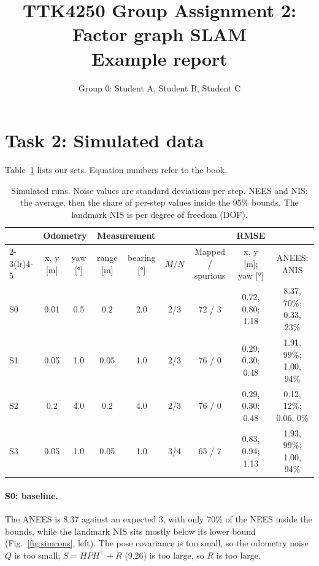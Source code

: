 \documentclass[11pt,a4paper]{article}
\title{TTK4250 Group Assignment 2: Factor graph SLAM\\[2pt]\large Example report}
\author{Group 0: Student A, Student B, Student C}
\date{}
\newcommand{\figref}[1]{Fig.~\ref{#1}}
\newcommand{\tabref}[1]{Table~\ref{#1}}
\begin{document}
\maketitle
\vspace{-2em}

\section*{Task 2: Simulated data}

\tabref{tab:sim} lists our sets. Equation numbers refer to the book.

\begin{table}[h]
\centering\footnotesize
\caption{Simulated runs. Noise values are standard deviations per step. NEES and NIS: the average, then the share of per-step values inside the 95\% bounds. The landmark NIS is per degree of freedom (DOF).}
\label{tab:sim}
\setlength{\tabcolsep}{4pt}
\begin{tabular}{lcccccccc}
\toprule
 & \multicolumn{2}{c}{Odometry} & \multicolumn{2}{c}{Measurement} & & & RMSE & \\
\cmidrule(lr){2-3}\cmidrule(lr){4-5}
 & x, y [m] & yaw [°] & range [m] & bearing [°] & \(M/N\) & Mapped / spurious & x, y [m]; yaw [°] & ANEES; ANIS \\
\midrule
S0 & 0.01 & 0.5 & 0.2 & 2.0 & 2/3 & 72 / 3 & 0.72, 0.80; 1.18 & 8.37, 70\%; 0.33, 23\% \\
S1 & 0.05 & 1.0 & 0.05 & 1.0 & 2/3 & 76 / 0 & 0.29, 0.30; 0.48 & 1.91, 99\%; 1.00, 94\% \\
S2 & 0.2 & 4.0 & 0.2 & 4.0 & 2/3 & 76 / 0 & 0.29, 0.30; 0.48 & 0.12, 12\%; 0.06, 0\% \\
S3 & 0.05 & 1.0 & 0.05 & 1.0 & 3/4 & 65 / 7 & 0.83, 0.94; 1.13 & 1.93, 99\%; 1.00, 94\% \\
\bottomrule
\end{tabular}
\end{table}

\paragraph{S0: baseline.} The ANEES is 8.37 against an expected 3, with only 70\% of the NEES inside the bounds, while the landmark NIS sits mostly below its lower bound (\figref{fig:simcons}, left). The pose covariance is too small, so the odometry noise \(Q\) is too small; \(S = HPH^\top + R\) (9.26) is too large, so \(R\) is too large.
\end{document}
